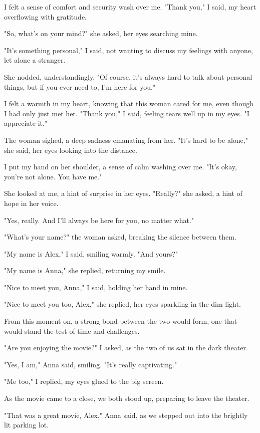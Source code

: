 \documentclass[smalldemyvopaper,11pt,twoside,onecolumn,openright,extrafontsizes]{memoir}
\begin{document}
I felt a sense of comfort and security wash over me. "Thank you," I said, my heart overflowing with gratitude.\par
"So, what's on your mind?" she asked, her eyes searching mine.\par
"It's something personal," I said, not wanting to discuss my feelings with anyone, let alone a stranger.\par
She nodded, understandingly. "Of course, it's always hard to talk about personal things, but if you ever need to, I'm here for you."\par
I felt a warmth in my heart, knowing that this woman cared for me, even though I had only just met her. "Thank you," I said, feeling tears well up in my eyes. "I appreciate it."\par
The woman sighed, a deep sadness emanating from her. "It's hard to be alone," she said, her eyes looking into the distance.\par
I put my hand on her shoulder, a sense of calm washing over me. "It's okay, you're not alone. You have me."\par
She looked at me, a hint of surprise in her eyes. "Really?" she asked, a hint of hope in her voice.\par
"Yes, really. And I'll always be here for you, no matter what."\par
"What's your name?" the woman asked, breaking the silence between them.\par
"My name is Alex," I said, smiling warmly. "And yours?"\par
"My name is Anna," she replied, returning my smile.\par
"Nice to meet you, Anna," I said, holding her hand in mine.\par
"Nice to meet you too, Alex," she replied, her eyes sparkling in the dim light.\par
From this moment on, a strong bond between the two would form, one that would stand the test of time and challenges.\par
"Are you enjoying the movie?" I asked, as the two of us sat in the dark theater.\par
"Yes, I am," Anna said, smiling. "It's really captivating."\par
"Me too," I replied, my eyes glued to the big screen.\par
As the movie came to a close, we both stood up, preparing to leave the theater.\par
"That was a great movie, Alex," Anna said, as we stepped out into the brightly lit parking lot.\par
\end{document}
